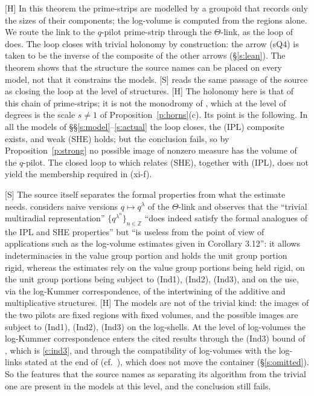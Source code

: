 \documentclass[11pt]{article}
\theoremstyle{plain}
\theoremstyle{definition}
\theoremstyle{remark}
\newcommand{\Smark}{\textup{[S]}}
\newcommand{\Hmark}{\textup{[H]}}
\begin{document}
\Hmark{} In this theorem the prime-strips are modelled by a groupoid that records only the
sizes of their components; the log-volume is computed from the regions alone. We route the
link to the $q$-pilot prime-strip through the $\Theta$-link, as the loop of
\cite[Rem.~3.9.5(ix)]{IUT3} does. The loop closes with trivial holonomy by construction:
the arrow (sQ4) is taken to be the inverse of the composite of the other arrows
(\S\ref{s:lean}). The theorem shows that the structure the source names can be placed on
every model, not that it constrains the models. \Smark{} \cite[\S6.2]{BS} reads the same
passage of the source as closing the loop at the level of structures. \Hmark{} The holonomy
here is that of this chain of prime-strips; it is not the monodromy of
\cite[Definition~3.6]{SL}, which at the level of degrees is the scale $s\ne1$ of
Proposition~\ref{p:horns}(c). Its point is the following. In all the models of \S\S\ref{s:model}--\ref{s:actual} the loop closes, the
(IPL) composite exists, and weak (SHE) holds; but the conclusion fails, so by
Proposition~\ref{p:strong} no possible image of nonzero measure has the volume of the
$q$-pilot. The closed loop
to which \cite[Rem.~3.11.1(iii)]{IUT3} relates (SHE), together with (IPL), does not yield
the membership required in (xi-f).

\Smark{} The source itself separates the formal properties from what the estimate needs.
\cite[Rem.~3.11.1(vi)--(viii)]{IUT3} considers naive versions $q\mapsto q^\lambda$ of the
$\Theta$-link and observes that the ``trivial multiradial representation''
$\{q^{\lambda^n}\}_{n\in\mathbb Z}$ ``does indeed satisfy the formal analogues of the IPL
and SHE properties'' but ``is useless from the point of view of applications such as the
log-volume estimates given in Corollary 3.12'': it allows indeterminacies in the value group
portion and holds the unit group portion rigid, whereas the estimates rely on the value
group portions being held rigid, on the unit group portions being subject to (Ind1),
(Ind2), (Ind3), and on the use, via the log-Kummer correspondence, of the intertwining of
the additive and multiplicative structures. \Hmark{} The models are not of the trivial
kind: the images of the two pilots are fixed regions with fixed volumes, and the possible
images are subject to (Ind1), (Ind2), (Ind3) on the log-shells. At the level of
log-volumes the log-Kummer correspondence enters the cited results through the (Ind3) bound
of \cite[Thm.~3.11(ii)]{IUT3}, which is \ref{c:ind3}, and through the compatibility of
log-volumes with the log-links stated at the end of \cite[Thm.~3.11(ii)]{IUT3}
(cf.\ \cite[Prop.~3.9(iv)]{IUT3}), which does not move the container
(\S\ref{s:omitted}). So the features that the
source names as separating its algorithm from the trivial one are present in the models at
this level, and the conclusion still fails.
\end{document}
